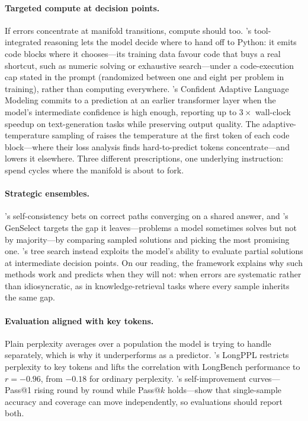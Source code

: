\paragraph{Targeted compute at decision points.}
If errors concentrate at manifold transitions, compute should too. \citet{moshkov2025aimo}'s tool-integrated reasoning lets the model decide where to hand off to Python: it emits code blocks where it chooses---its training data favour code that buys a real shortcut, such as numeric solving or exhaustive search---under a code-execution cap stated in the prompt (randomized between one and eight per problem in training), rather than computing everywhere. \citet{schuster2022calm}'s Confident Adaptive Language Modeling commits to a prediction at an earlier transformer layer when the model's intermediate confidence is high enough, reporting up to $3\times$ wall-clock speedup on text-generation tasks while preserving output quality. The adaptive-temperature sampling of \citet{zhu2024hotorcold} raises the temperature at the first token of each code block---where their loss analysis finds hard-to-predict tokens concentrate---and lowers it elsewhere. Three different prescriptions, one underlying instruction: spend cycles where the manifold is about to fork.

\paragraph{Strategic ensembles.}
\citet{wang2023self}'s self-consistency bets on correct paths converging on a shared answer, and \citet{moshkov2025aimo}'s GenSelect targets the gap it leaves---problems a model sometimes solves but not by majority---by comparing sampled solutions and picking the most promising one. \citet{yao2023tree}'s tree search instead exploits the model's ability to evaluate partial solutions at intermediate decision points. On our reading, the framework explains why such methods work and predicts when they will not: when errors are systematic rather than idiosyncratic, as in knowledge-retrieval tasks where every sample inherits the same gap.

\paragraph{Evaluation aligned with key tokens.}
Plain perplexity averages over a population the model is trying to handle separately, which is why it underperforms as a predictor. \citet{fang2024what}'s LongPPL restricts perplexity to key tokens and lifts the correlation with LongBench performance to $r = -0.96$, from $-0.18$ for ordinary perplexity. \citet{costello2025think}'s self-improvement curves---Pass@1 rising round by round while Pass@$k$ holds---show that single-sample accuracy and coverage can move independently, so evaluations should report both.

